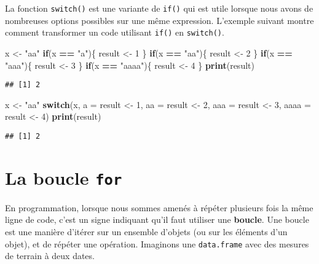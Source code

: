 \documentclass[]{book}
\newenvironment{Shaded}{\begin{snugshade}}{\end{snugshade}}
\newcommand{\KeywordTok}[1]{\textcolor[rgb]{0.13,0.29,0.53}{\textbf{#1}}}
\newcommand{\DataTypeTok}[1]{\textcolor[rgb]{0.13,0.29,0.53}{#1}}
\newcommand{\DecValTok}[1]{\textcolor[rgb]{0.00,0.00,0.81}{#1}}
\newcommand{\StringTok}[1]{\textcolor[rgb]{0.31,0.60,0.02}{#1}}
\newcommand{\ControlFlowTok}[1]{\textcolor[rgb]{0.13,0.29,0.53}{\textbf{#1}}}
\newcommand{\OperatorTok}[1]{\textcolor[rgb]{0.81,0.36,0.00}{\textbf{#1}}}
\newcommand{\NormalTok}[1]{#1}
\theoremstyle{definition}
\theoremstyle{definition}
\theoremstyle{definition}
\theoremstyle{remark}
\begin{document}
La fonction \texttt{switch()} est une variante de \texttt{if()} qui est
utile lorsque nous avons de nombreuses options possibles sur une même
expression. L'exemple suivant montre comment transformer un code
utilisant \texttt{if()} en \texttt{switch()}.

\begin{Shaded}
\begin{Highlighting}[]
\NormalTok{x <-}\StringTok{ "aa"}
\ControlFlowTok{if}\NormalTok{(x }\OperatorTok{==}\StringTok{ "a"}\NormalTok{)\{}
\NormalTok{  result <-}\StringTok{ }\DecValTok{1}
\NormalTok{\}}
\ControlFlowTok{if}\NormalTok{(x }\OperatorTok{==}\StringTok{ "aa"}\NormalTok{)\{}
\NormalTok{  result <-}\StringTok{ }\DecValTok{2}
\NormalTok{\}}
\ControlFlowTok{if}\NormalTok{(x }\OperatorTok{==}\StringTok{ "aaa"}\NormalTok{)\{}
\NormalTok{  result <-}\StringTok{ }\DecValTok{3}
\NormalTok{\}}
\ControlFlowTok{if}\NormalTok{(x }\OperatorTok{==}\StringTok{ "aaaa"}\NormalTok{)\{}
\NormalTok{  result <-}\StringTok{ }\DecValTok{4}
\NormalTok{\}}
\KeywordTok{print}\NormalTok{(result)}
\end{Highlighting}
\end{Shaded}

\begin{verbatim}
## [1] 2
\end{verbatim}

\begin{Shaded}
\begin{Highlighting}[]
\NormalTok{x <-}\StringTok{ "aa"}
\ControlFlowTok{switch}\NormalTok{(x, }
  \DataTypeTok{a =}\NormalTok{ result <-}\StringTok{ }\DecValTok{1}\NormalTok{,}
  \DataTypeTok{aa =}\NormalTok{ result <-}\StringTok{ }\DecValTok{2}\NormalTok{,}
  \DataTypeTok{aaa =}\NormalTok{ result <-}\StringTok{ }\DecValTok{3}\NormalTok{,}
  \DataTypeTok{aaaa =}\NormalTok{ result <-}\StringTok{ }\DecValTok{4}\NormalTok{)}
\KeywordTok{print}\NormalTok{(result)}
\end{Highlighting}
\end{Shaded}

\begin{verbatim}
## [1] 2
\end{verbatim}

\hypertarget{l17for}{\section{\texorpdfstring{La boucle
\texttt{for}}{La boucle for}}\label{l17for}}

En programmation, lorsque nous sommes amenés à répéter plusieurs fois la
même ligne de code, c'est un signe indiquant qu'il faut utiliser une
\textbf{boucle}. Une boucle est une manière d'itérer sur un ensemble
d'objets (ou sur les éléments d'un objet), et de répéter une opération.
Imaginons une \texttt{data.frame} avec des mesures de terrain à deux
dates.
\end{document}
